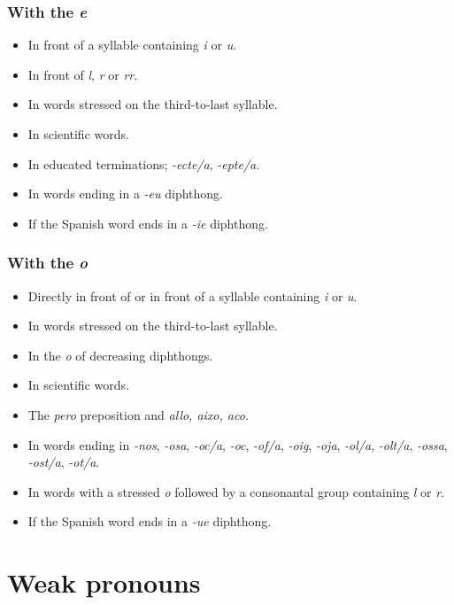 \documentclass{article}
\begin{document}
\subsubsection*{With the \emph{e}}

\begin{itemize}
    \item In front of a syllable containing \emph{i} or \emph{u}.
    \item In front of \emph{l}, \emph{r} or \emph{rr}.
    \item In words stressed on the third-to-last syllable.
    \item In scientific words.
    \item In educated terminations; \emph{-ecte/a}, \emph{-epte/a}.
    \item In words ending in a \emph{-eu} diphthong.
    \item If the Spanish word ends in a \emph{-ie} diphthong.
\end{itemize}

\subsubsection*{With the \emph{o}}

\begin{itemize}
    \item Directly in front of or in front of a syllable containing \emph{i} or
    \emph{u}.
    \item In words stressed on the third-to-last syllable.
    \item In the \emph{o} of decreasing diphthongs.
    \item In scientific words.
    \item The \emph{pero} preposition and \emph{allo, aixo, aco}.
    \item In words ending in \emph{-nos}, \emph{-osa}, \emph{-oc/a}, \emph{-oc},
    \emph{-of/a}, \emph{-oig}, \emph{-oja}, \emph{-ol/a}, \emph{-olt/a},
    \emph{-ossa}, \emph{-ost/a}, \emph{-ot/a}.
    \item In words with a stressed \emph{o} followed by a consonantal group
    containing \emph{l} or \emph{r}.
    \item If the Spanish word ends in a \emph{-ue} diphthong.
\end{itemize}

\section*{Weak pronouns}
\end{document}
